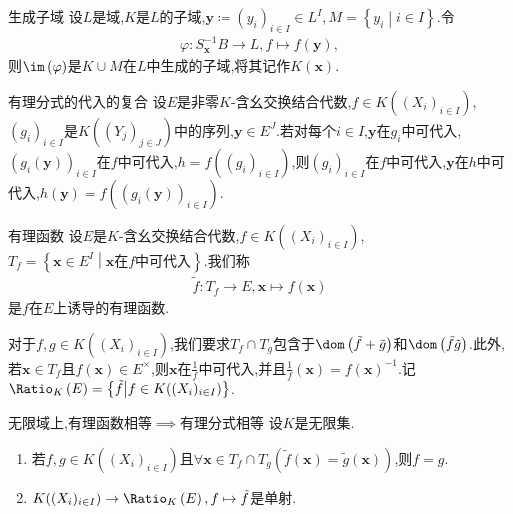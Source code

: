 \begin{corollary}{生成子域}{}
	设$L$是域,$K$是$L$的子域,$\mathbf{y}\coloneq\left(y_{i}\right)_{i\in I}\in L^{I},M=\left\{y_{i}\middle|i\in I\right\}$.令
	\begin{align*}
		\varphi:S_{\mathbf{x}}^{-1}B\to L,f\mapsto f\left(\mathbf{y}\right),
	\end{align*}
	则$\im\left(\varphi\right)$是$K\cup M$在$L$中生成的子域,将其记作$K\left(\mathbf{x}\right)$.
\end{corollary}

\begin{proposition}{有理分式的代入的复合}{}
	设$E$是非零$K$-含幺交换结合代数,$f\in K((X_{i})_{i\in I})$,$\left(g_{i}\right)_{i\in I}$是$K((Y_{j})_{j\in J})$中的序列,$\mathbf{y}\in E^{J}$.若对每个$i\in I$,$\mathbf{y}$在$g_{i}$中可代入,$\left(g_{i}\left(\mathbf{y}\right)\right)_{i\in I}$在$f$中可代入,$h=f\left(\left(g_{i}\right)_{i\in I}\right)$,则$\left(g_{i}\right)_{i\in I}$在$f$中可代入,$\mathbf{y}$在$h$中可代入,$h\left(\mathbf{y}\right)=f\left(\left(g_{i}\left(\mathbf{y}\right)\right)_{i\in I}\right)$.
\end{proposition}

\begin{definition}{有理函数}{}
	设$E$是$K$-含幺交换结合代数,$f\in K((X_{i})_{i\in I})$,$T_{f}=\left\{\mathbf{x}\in E^{I}\middle|\mathbf{x}\text{在}f\text{中可代入}\right\}$.我们称
	\begin{align*}
		\tilde{f}:T_{f}\to E,\mathbf{x}\mapsto f\left(\mathbf{x}\right)
	\end{align*}
	是$f$在$E$上诱导的有理函数.
\end{definition}

\begin{remark}{}{}
	对于$f,g\in K((X_{i})_{i\in I})$,我们要求$T_{f}\cap T_{g}$包含于$\dom\left(\tilde{f}+\tilde{g}\right)$和$\dom\left(\tilde{f}\tilde{g}\right)$.此外,若$\mathbf{x}\in T_{f}$且$f\left(\mathbf{x}\right)\in E^{\times}$,则$\mathbf{x}$在$\frac{1}{f}$中可代入,并且$\frac{1}{f}\left(\mathbf{x}\right)=f\left(\mathbf{x}\right)^{-1}$.记$\Ratio_{K}\left(E\right)=\left\{\tilde{f}\middle|f\in K((X_{i})_{i\in I})\right\}$.
\end{remark}

\begin{theorem}{无限域上,有理函数相等$\implies$有理分式相等}{}
	设$K$是无限集.
	\begin{enumerate}
		\item 若$f,g\in K((X_{i})_{i\in I})$且$\forall\mathbf{x}\in T_{f}\cap T_{g}\left(\tilde{f}\left(\mathbf{x}\right)=\tilde{g}\left(\mathbf{x}\right)\right)$,则$f=g$.
		\item $K((X_{i})_{i\in I})\to\Ratio_{K}\left(E\right),f\mapsto\tilde{f}$是单射.
	\end{enumerate}
\end{theorem}

